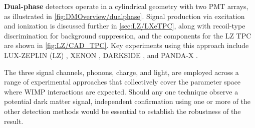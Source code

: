 \begin{itemize}
    \textbf{Dual-phase} detectors operate in a cylindrical geometry with two PMT arrays, as illustrated in \autoref{fig:DMOverview/dualphase}. Signal production via excitation and ionization is discussed further in \autoref{sec:LZ/LXeTPC}, along with recoil-type discrimination for background suppression, and the components for the LZ TPC are shown in \autoref{fig:LZ/CAD_TPC}. Key experiments using this approach include LUX-ZEPLIN (LZ) \cite{LZNIMA}, XENON \cite{XENON:2025vwd}, DARKSIDE \cite{DarkSide-20k:2017zyg}, and PANDA-X \cite{PandaX-4T:2021bab}.
\end{itemize}
\noindent
The three signal channels, phonons, charge, and light, are employed across a range of experimental approaches that collectively cover the parameter space where WIMP interactions are expected. Should any one technique observe a potential dark matter signal, independent confirmation using one or more of the other detection methods would be essential to establish the robustness of the result.

